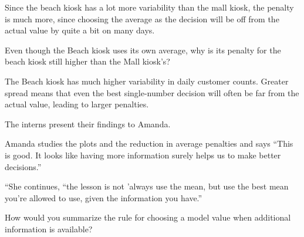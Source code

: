 \documentclass[
  12pt,
  letterpaper,
  DIV=11,
  numbers=noendperiod]{scrreprt}
\begin{document}
Since the beach kiosk has a lot more variability than the mall kiosk,
the penalty is much more, since choosing the average as the decision
will be off from the actual value by quite a bit on many days.

\begin{tcolorbox}[enhanced jigsaw, colback=white, leftrule=.75mm, toprule=.15mm, bottomtitle=1mm, breakable, coltitle=black, toptitle=1mm, title={Quick Check}, opacitybacktitle=0.6, colbacktitle=quarto-callout-note-color!10!white, arc=.35mm, left=2mm, colframe=quarto-callout-note-color-frame, titlerule=0mm, rightrule=.15mm, bottomrule=.15mm, opacityback=0]

Even though the Beach kiosk uses its own average, why is its penalty for
the beach kiosk still higher than the Mall kiosk's?

\end{tcolorbox}

\begin{tcolorbox}[enhanced jigsaw, colback=white, leftrule=.75mm, toprule=.15mm, bottomtitle=1mm, breakable, coltitle=black, toptitle=1mm, title={Suggested answer}, opacitybacktitle=0.6, colbacktitle=quarto-callout-note-color!10!white, arc=.35mm, left=2mm, colframe=quarto-callout-note-color-frame, titlerule=0mm, rightrule=.15mm, bottomrule=.15mm, opacityback=0]

The Beach kiosk has much higher variability in daily customer counts.
Greater spread means that even the best single-number decision will
often be far from the actual value, leading to larger penalties.

\end{tcolorbox}

The interns present their findings to Amanda.

Amanda studies the plots and the reduction in average penalties and says
``This is good. It looks like having more information surely helps us to
make better decisions.''

``She continues, ``the lesson is not 'always use the mean, but use the
best mean you're allowed to use, given the information you have.''

\begin{tcolorbox}[enhanced jigsaw, colback=white, leftrule=.75mm, toprule=.15mm, bottomtitle=1mm, breakable, coltitle=black, toptitle=1mm, title={Quick Check}, opacitybacktitle=0.6, colbacktitle=quarto-callout-note-color!10!white, arc=.35mm, left=2mm, colframe=quarto-callout-note-color-frame, titlerule=0mm, rightrule=.15mm, bottomrule=.15mm, opacityback=0]

How would you summarize the rule for choosing a model value when
additional information is available?

\end{tcolorbox}
\end{document}
